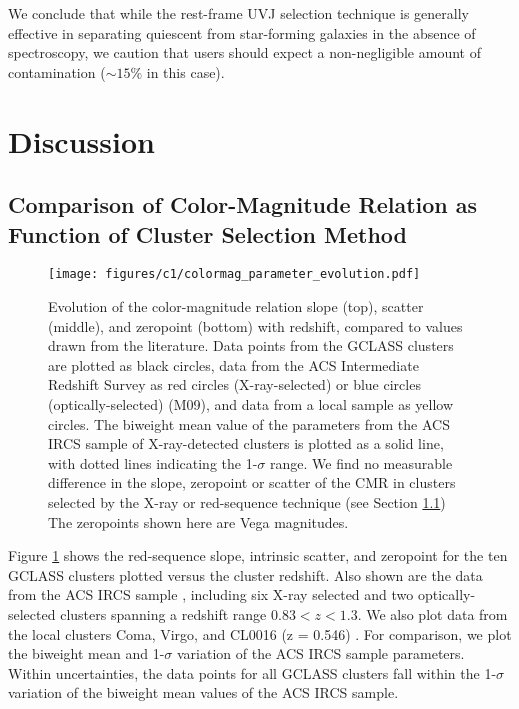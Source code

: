 We conclude that while the rest-frame UVJ selection technique is generally effective in separating quiescent from star-forming galaxies in the absence of spectroscopy, we caution that users should expect a non-negligible amount of contamination ($\sim 15\%$ in this case).


\section{Discussion} \label{comparison}

\subsection{Comparison of Color-Magnitude Relation as Function of Cluster Selection Method}\label{sec-evo}

\begin{figure}
\texttt{[image: figures/c1/colormag\_parameter\_evolution.pdf]}
\caption[Evolution of color-magnitude relation slope, scatter, and intercept with redshift]{Evolution of the color-magnitude relation slope (top), scatter (middle), and zeropoint (bottom) with redshift, compared to values drawn from the literature. Data points from the GCLASS clusters are plotted as black circles, data from the ACS Intermediate Redshift Survey as red circles (X-ray-selected) or blue circles (optically-selected) (M09), and data from a local sample \citep{Bower:1992mb,van-Dokkum:1998wd,Ellis:1997lk} as yellow circles. The biweight mean value of the parameters from the ACS IRCS sample of X-ray-detected clusters is plotted as a solid line, with dotted lines indicating the 1-$\sigma$ range. We find no measurable difference in the slope, zeropoint or scatter of the CMR in clusters selected by the X-ray or red-sequence technique (see Section \ref{sec-evo}) The zeropoints shown here are Vega magnitudes.
\label{fig-params}}
\end{figure}

Figure \ref{fig-params} shows the red-sequence slope, intrinsic scatter, and zeropoint for the ten GCLASS clusters plotted versus the cluster redshift. Also shown are the data from the ACS IRCS sample \citep[][M09]{fordACS}, including six X-ray selected and two optically-selected clusters spanning a redshift range $0.83 < z < 1.3$. We also plot data from the local clusters Coma, Virgo, and CL0016 (z = 0.546) \citep{Bower:1992mb,van-Dokkum:1998wd,Ellis:1997lk}. For comparison, we plot the biweight mean and 1-$\sigma$ variation of the ACS IRCS sample parameters. Within uncertainties, the data points for all GCLASS clusters fall within the 1-$\sigma$ variation of the biweight mean values of the ACS IRCS sample.

